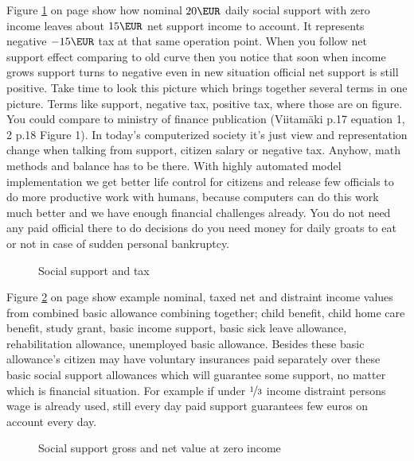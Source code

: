 Figure \ref{fig:SocTax} on page \pageref{fig:SocTax} show how nominal $20\EUR$ daily
social support with zero income leaves about $15\EUR$ net support income to account.
It represents negative $-15\EUR$ tax at that same operation point.
When you follow net support effect comparing to old curve
then you notice that soon when income grows support turns to negative
even in new situation official net support is still positive.
Take time to look this picture which brings together several terms in one picture.
Terms like support, negative tax, positive tax, where those are on figure.
You could compare to ministry of finance publication
(Viitam\"aki\cite{VM_46_2019} p.17 equation 1, 2 p.18 Figure 1).
In today's computerized society it's just view and representation change
when talking from support, citizen salary or negative tax.
Anyhow, math methods and balance has to be there.
With highly automated model implementation we get better life control for citizens
and release few officials to do more productive work with humans,
because computers can do this work much better
and we have enough financial challenges already.
You do not need any paid official there
to do decisions do you need money for daily groats to eat or not
in case of sudden personal bankruptcy.
\begin{figure} %
 \begin{center}
  \caption{Social support and tax}
  \label{fig:SocTax}  
 \end{center}
\end{figure}

Figure \ref{fig:SocialSu} on page \pageref{fig:SocialSu} show example nominal,
taxed net and distraint income values from combined basic allowance combining together;
child benefit,
child home care benefit,
study grant,
basic income support,
basic sick leave allowance,
rehabilitation allowance,
unemployed basic allowance.
Besides these basic allowance's citizen may have voluntary insurances
paid separately over these basic social support allowances
which will guarantee some support, no matter which is financial situation.
For example if under $\nicefrac{1}{3}$ income distraint persons wage is already used,
still every day paid support guarantees few euros on account every day.

\begin{figure} %
 \begin{center}
  \caption{Social support gross and net value at zero income}
  \label{fig:SocialSu} 
 \end{center}
\end{figure}

